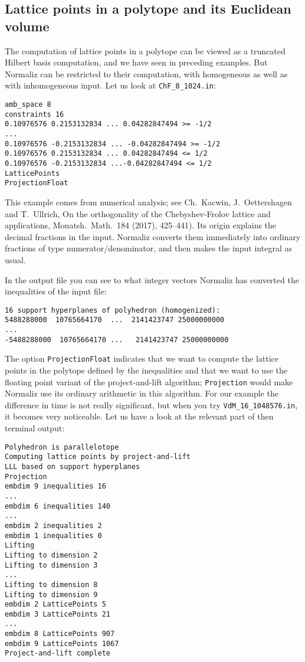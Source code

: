 \documentclass[12pt,a4paper]{scrartcl}
\theoremstyle{definition}
\begin{document}
\subsection{Lattice points in a polytope and its Euclidean volume}\label{project_example}

The computation of lattice points in a polytope can be viewed as a truncated Hilbert basis computation, and we have seen in preceding examples. But Normaliz can be restricted to their computation, with homogeneous as well as with inhomogeneous input. Let us look at \verb|ChF_8_1024.in|:

\begin{Verbatim}
amb_space 8
constraints 16
0.10976576 0.2153132834 ... 0.04282847494 >= -1/2
...
0.10976576 -0.2153132834 ... -0.04282847494 >= -1/2
0.10976576 0.2153132834 ... 0.04282847494 <= 1/2
0.10976576 -0.2153132834 ...-0.04282847494 <= 1/2
LatticePoints
ProjectionFloat
\end{Verbatim}

This example comes from numerical analysis; see Ch.~Kacwin, J.~Oettershagen and T.~Ullrich, On the orthogonality of the Chebyshev-Frolov lattice and applications, Monatsh.\ Math.\ 184 (2017), 425--441). Its origin explains the decimal fractions in the input. Normaliz converts them immediately into ordinary fractions of type numerator/denominator, and then makes the input integral as usual.

In the output file you can see to what integer vectors Normaliz has converted the inequalities of the input file:
\begin{Verbatim}
16 support hyperplanes of polyhedron (homogenized):
5488288000  10765664170  ...  2141423747 25000000000
...
-5488288000  10765664170 ...   2141423747 25000000000
\end{Verbatim}

The option \verb|ProjectionFloat| indicates that we want to compute the lattice points in the polytope defined by the inequalities and that we want to use the floating point variant of the project-and-lift algorithm; \verb|Projection| would make Normaliz use its ordinary arithmetic in this algorithm. For our example the difference in time is not really significant, but when you try \verb|VdM_16_1048576.in|, it becomes very noticeable. Let us have a look at the relevant part of then terminal output:
\begin{Verbatim}
Polyhedron is parallelotope
Computing lattice points by project-and-lift
LLL based on support hyperplanes
Projection
embdim 9 inequalities 16
...
embdim 6 inequalities 140
...
embdim 2 inequalities 2
embdim 1 inequalities 0
Lifting
Lifting to dimension 2
Lifting to dimension 3
...
Lifting to dimension 8
Lifting to dimension 9
embdim 2 LatticePoints 5
embdim 3 LatticePoints 21
...
embdim 8 LatticePoints 907
embdim 9 LatticePoints 1067
Project-and-lift complete
\end{Verbatim}
\end{document}
